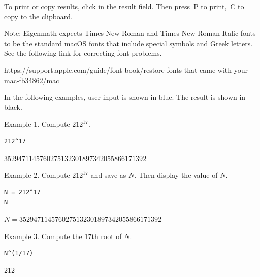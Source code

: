 \documentclass[12pt]{article}
\begin{document}
\bigskip
To print or copy results, click in the result field.
Then press \cmd$\,$P to print, \cmd$\,$C to copy to the clipboard.

\bigskip
Note: Eigenmath expects Times New Roman and Times New Roman Italic fonts
to be the standard macOS fonts that include special symbols and Greek letters.
See the following link for correcting font problems.

\bigskip
{\scriptsize
https://support.apple.com/guide/font-book/restore-fonts-that-came-with-your-mac-fb34862/mac
}

\newpage

In the following examples, user input is shown in blue.
The result is shown in black.

\bigskip
Example 1. Compute $212^{17}$.

{\color{blue}
\begin{verbatim}
212^17
\end{verbatim}}

$3529471145760275132301897342055866171392$

\bigskip
Example 2. Compute $212^{17}$ and save as $N$.
Then display the value of $N$.

{\color{blue}
\begin{verbatim}
N = 212^17
N
\end{verbatim}}

$N=3529471145760275132301897342055866171392$

\bigskip
Example 3. Compute the 17th root of $N$.

{\color{blue}
\begin{verbatim}
N^(1/17)
\end{verbatim}}

$212$
\end{document}
